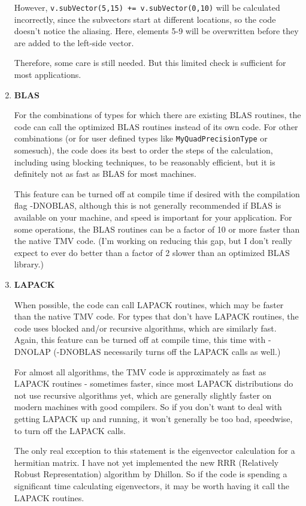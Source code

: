 \documentclass[twoside,letterpaper,11pt]{article}
\renewcommand{\tt}[1]{{\lstinline {#1}}}
\begin{document}
\begin{enumerate}
However, \tt{v.subVector(5,15) += v.subVector(0,10)} will be calculated 
incorrectly, since the subvectors start at different locations, so the code
doesn't notice the aliasing.  Here, elements 5-9 will be overwritten before
they are added to the left-side vector.

Therefore, some care is still needed.  But this limited check is sufficient
for most applications.

\item
\textbf{BLAS}

For the combinations of types for which there are existing BLAS
routines, the code can call the optimized BLAS routines instead of its own 
code.  For other combinations (or for user defined types like 
\tt{MyQuadPrecisionType} or somesuch), 
the code does its best to order the steps of the calculation, including
using blocking techniques, to be 
reasonably efficient, but it is definitely not as fast as BLAS for
most machines.

This feature can be turned off at compile time if desired with the 
compilation flag -DNOBLAS, although this is not generally recommended if 
BLAS is available on your machine, and speed is important for your 
application.  For some operations, the BLAS routines can be a factor of 
10 or more faster than the native TMV code.  (I'm working on reducing this
gap, but I don't really expect to ever do better than a factor of 2 slower
than an optimized BLAS library.)

\item
\textbf{LAPACK}

When possible, the code can call LAPACK routines, which
may be faster than the native TMV code.  For types that don't have LAPACK routines, 
the code uses blocked and/or recursive algorithms, which are similarly fast.  
Again, this feature can be turned off at compile time, this time with -DNOLAP
(-DNOBLAS necessarily turns off the LAPACK calls as well.)

For almost all algorithms, 
the TMV code is approximately as fast as LAPACK routines -
sometimes faster, since most
LAPACK distributions do not use recursive algorithms yet, which are generally
slightly faster on modern machines with good compilers. 
So if you don't want to deal with getting LAPACK
up and running, it won't generally be too bad, speedwise, 
to turn off the LAPACK calls.

The only real exception to this statement
is the eigenvector calculation for a hermitian matrix.  I have not yet 
implemented the new RRR
(Relatively Robust Representation) algorithm by Dhillon.  So if the code is
spending a significant time calculating eigenvectors, it may be worth having it call the
LAPACK routines.


\end{enumerate}
\end{document}

